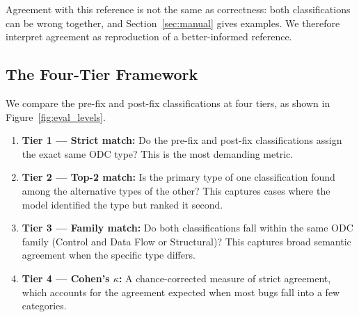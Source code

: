 \documentclass{iutbscthesis}
\begin{document}
Agreement with this reference is not the same as correctness: both classifications can be wrong together, and Section~\ref{sec:manual} gives examples. We therefore interpret agreement as reproduction of a better-informed reference.

\subsection{The Four-Tier Framework}

We compare the pre-fix and post-fix classifications at four tiers, as shown in Figure~\ref{fig:eval_levels}.

\begin{enumerate}
    \item \textbf{Tier 1 --- Strict match:} Do the pre-fix and post-fix classifications assign the exact same ODC type? This is the most demanding metric.
    \item \textbf{Tier 2 --- Top-2 match:} Is the primary type of one classification found among the alternative types of the other? This captures cases where the model identified the type but ranked it second.
    \item \textbf{Tier 3 --- Family match:} Do both classifications fall within the same ODC family (Control and Data Flow or Structural)? This captures broad semantic agreement when the specific type differs.
    \item \textbf{Tier 4 --- Cohen's $\kappa$:} A chance-corrected measure of strict agreement, which accounts for the agreement expected when most bugs fall into a few categories.
\end{enumerate}
\end{document}
